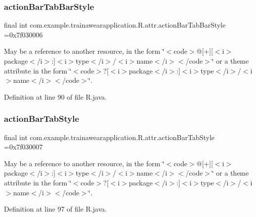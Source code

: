 \subsubsection{\texorpdfstring{actionBarTabBarStyle}{actionBarTabBarStyle}}
{\footnotesize\ttfamily final int com.\+example.\+trainawearapplication.\+R.\+attr.\+action\+Bar\+Tab\+Bar\+Style =0x7f030006\hspace{0.3cm}{\ttfamily [static]}}

May be a reference to another resource, in the form \char`\"{}$<$code$>$@\mbox{[}+\mbox{]}\mbox{[}$<$i$>$package$<$/i$>$\+:\mbox{]}$<$i$>$type$<$/i$>$/$<$i$>$name$<$/i$>$$<$/code$>$\char`\"{} or a theme attribute in the form \char`\"{}$<$code$>$?\mbox{[}$<$i$>$package$<$/i$>$\+:\mbox{]}$<$i$>$type$<$/i$>$/$<$i$>$name$<$/i$>$$<$/code$>$\char`\"{}. 

Definition at line 90 of file R.\+java.

\mbox{\label{classcom_1_1example_1_1trainawearapplication_1_1_r_1_1attr_a99602b55c183de6da2ba3e77333c84b5}} 
\subsubsection{\texorpdfstring{actionBarTabStyle}{actionBarTabStyle}}
{\footnotesize\ttfamily final int com.\+example.\+trainawearapplication.\+R.\+attr.\+action\+Bar\+Tab\+Style =0x7f030007\hspace{0.3cm}{\ttfamily [static]}}

May be a reference to another resource, in the form \char`\"{}$<$code$>$@\mbox{[}+\mbox{]}\mbox{[}$<$i$>$package$<$/i$>$\+:\mbox{]}$<$i$>$type$<$/i$>$/$<$i$>$name$<$/i$>$$<$/code$>$\char`\"{} or a theme attribute in the form \char`\"{}$<$code$>$?\mbox{[}$<$i$>$package$<$/i$>$\+:\mbox{]}$<$i$>$type$<$/i$>$/$<$i$>$name$<$/i$>$$<$/code$>$\char`\"{}. 

Definition at line 97 of file R.\+java.

\mbox{\label{classcom_1_1example_1_1trainawearapplication_1_1_r_1_1attr_aaeb460d77caedac38e8c00450759e5b8}} 
